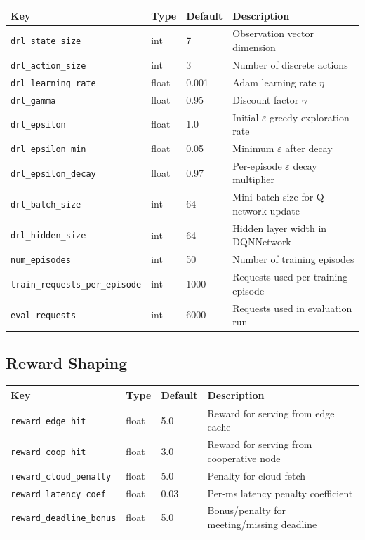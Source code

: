 \documentclass[12pt]{article}
\begin{document}
\begin{tabularx}{\linewidth}{@{}l l l X@{}}
\toprule
\textbf{Key} & \textbf{Type} & \textbf{Default} & \textbf{Description} \\
\midrule
\texttt{drl\_state\_size} & int & 7 & Observation vector dimension \\
\texttt{drl\_action\_size} & int & 3 & Number of discrete actions \\
\texttt{drl\_learning\_rate} & float & 0.001 & Adam learning rate $\eta$ \\
\texttt{drl\_gamma} & float & 0.95 & Discount factor $\gamma$ \\
\texttt{drl\_epsilon} & float & 1.0 & Initial $\varepsilon$-greedy exploration rate \\
\texttt{drl\_epsilon\_min} & float & 0.05 & Minimum $\varepsilon$ after decay \\
\texttt{drl\_epsilon\_decay} & float & 0.97 & Per-episode $\varepsilon$ decay multiplier \\
\texttt{drl\_batch\_size} & int & 64 & Mini-batch size for Q-network update \\
\texttt{drl\_hidden\_size} & int & 64 & Hidden layer width in DQNNetwork \\
\texttt{num\_episodes} & int & 50 & Number of training episodes \\
\texttt{train\_requests\_per\_episode} & int & 1000 & Requests used per training episode \\
\texttt{eval\_requests} & int & 6000 & Requests used in evaluation run \\
\bottomrule
\end{tabularx}

\subsection{Reward Shaping}

\begin{tabularx}{\linewidth}{@{}l l l X@{}}
\toprule
\textbf{Key} & \textbf{Type} & \textbf{Default} & \textbf{Description} \\
\midrule
\texttt{reward\_edge\_hit} & float & 5.0 & Reward for serving from edge cache \\
\texttt{reward\_coop\_hit} & float & 3.0 & Reward for serving from cooperative node \\
\texttt{reward\_cloud\_penalty} & float & 5.0 & Penalty for cloud fetch \\
\texttt{reward\_latency\_coef} & float & 0.03 & Per-ms latency penalty coefficient \\
\texttt{reward\_deadline\_bonus} & float & 5.0 & Bonus/penalty for meeting/missing deadline \\
\bottomrule
\end{tabularx}
\end{document}
